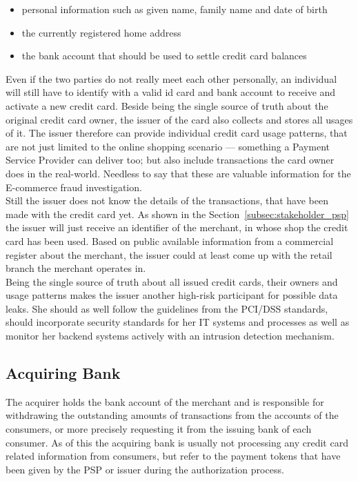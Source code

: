 \begin{itemize}
		\item personal information such as given name, family name and date of birth
		\item the currently registered home address
		\item the bank account that should be used to settle credit card balances
\end{itemize}

Even if the two parties do not really meet each other personally, an individual will still have to identify with a valid id card and bank account to receive and activate a new credit card. Beside being the single source of truth about the original credit card owner, the issuer of the card also collects and stores all  usages of it. The issuer therefore can provide individual credit card usage patterns, that are not just limited to the online shopping scenario --- something a Payment Service Provider can deliver too; but also include transactions the card owner does in the real-world. Needless to say that these are valuable information for the E-commerce fraud investigation. \\

Still the issuer does not know the details of the transactions, that have been made with the credit card yet. As shown in the Section~\ref{subsec:stakeholder_psp} the issuer will just receive an identifier of the merchant, in whose shop the credit card has been used. Based on public available information from a commercial register about the merchant, the issuer could at least come up with the retail branch the merchant operates in. \\

Being the single source of truth about all issued credit cards, their owners and usage patterns makes the issuer another high-risk participant for possible data leaks. She should as well follow the guidelines from the PCI/DSS standards, should incorporate security standards for her IT systems and processes as well as monitor her backend systems actively with an intrusion detection mechanism.


\subsection{Acquiring Bank}
\label{subsec:stakeholder_acquirer}

The acquirer holds the bank account of the merchant and is responsible for withdrawing the outstanding amounts of transactions from the accounts of the consumers, or more precisely requesting it from the issuing bank of each consumer. As of this the acquiring bank is usually not processing any credit card related information from consumers, but refer to the payment tokens that have been given by the \gls{PSP} or issuer during the authorization process. \\

